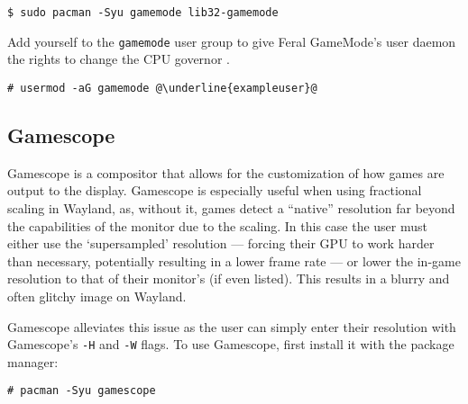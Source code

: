 \documentclass[a4paper]{article}
\begin{document}
\begin{lstlisting}
$ sudo pacman -Syu gamemode lib32-gamemode
\end{lstlisting}

Add yourself to the \lstinline|gamemode| user group to give Feral GameMode's user daemon the rights to change the CPU governor \cite{arch-wiki-gamemode}.
\begin{lstlisting}[escapechar=@]
# usermod -aG gamemode @\underline{exampleuser}@
\end{lstlisting}

\subsection{Gamescope}

Gamescope is a compositor that allows for the customization of how games are output to the display.
Gamescope is especially useful when using fractional scaling in Wayland, as, without it, games detect a ``native'' resolution far beyond the capabilities of the monitor due to the scaling.
In this case the user must either use the `supersampled' resolution --- forcing their GPU to work harder than necessary, potentially resulting in a lower frame rate --- or lower the in-game resolution to that of their monitor's (if even listed).
This results in a blurry and often glitchy image on Wayland.

Gamescope alleviates this issue as the user can simply enter their resolution with Gamescope's \lstinline|-H| and \lstinline|-W| flags.
To use Gamescope, first install it with the package manager:
\begin{lstlisting}
# pacman -Syu gamescope
\end{lstlisting}
\end{document}
